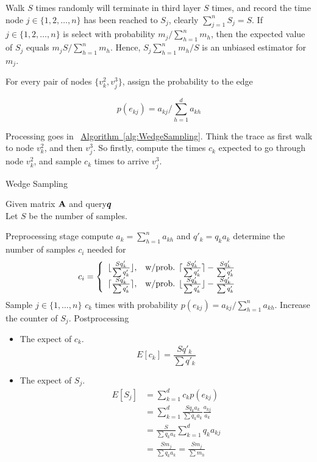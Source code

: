 \documentclass{article}
\newcommand{\V}[1]{{\bm{{\MakeLowercase{#1}}}}}%
\newcommand{\M}[1]{{\bm{\mathbf{\MakeUppercase{#1}}}}}%
\newcommand{\Alg}[1]{\hyperref[alg:#1]{Algorithm~\ref*{alg:#1}}}
\begin{document}
Walk $S$ times randomly will terminate in third layer $S$ times, and record the time node $j\in\{1,2,\ldots,n\}$ has been reached to $S_j$, clearly $\sum_{j=1}^{n}S_j = S$. If $j\in\{1,2,\ldots,n\}$ is select with probability $m_j/\sum_{h=1}^{n}m_h $, then the expected value of $S_j$ equals $m_jS/\sum_{h=1}^{n}m_h$. Hence, $S_j\sum_{h=1}^{n}m_h/S$ is an unbiased estimator for $m_j$.

For every pair of nodes $\{v_k^2,v_j^3\}$, assign the probability to the edge

\[p(e_{kj}) = a_{kj}/\sum_{h=1}^{d}a_{kh}\]

Processing goes in ~\Alg{WedgeSampling}. Think the trace as first walk to node $v_k^2$, and then $v_j^3$. So firstly, compute the times $c_k$ expected to go through node $v_k^2$, and sample $c_k$ times to arrive $v_j^3$.
\begin{algorithm}[t]
    \caption{Wedge Sampling}
    \label{alg:WedgeSampling}
    Given  matrix $\M{A}$ and query$\V{q}$\\
    Let $S$ be the number of samples.
    \begin{algorithmic}[1]
    \State Preprocessing stage
    \State compute $a_k = \sum_{h=1}^{n}a_{kh}$ and $q'_k = q_ka_k$
    \EndFor
     determine the number of samples $c_i$ needed for
    \State
    \begin{equation*}c_i=
    \left\{
      \begin{array}{ll}
        \lfloor \frac{Sq'_k}{\sum q'_k} \rfloor,
        & \hbox{w/prob. $\lceil \frac{Sq'_k}{\sum q'_k} \rceil - \frac{Sq'_k}{\sum q'_k}$} \\
        \lceil \frac{Sq'_k}{\sum q'_k} \rceil,
        & \hbox{w/prob. $\lfloor \frac{Sq'_k}{\sum q'_k} \rfloor - \frac{Sq'_k}{\sum q'_k}$}
      \end{array}
    \right.
    \end{equation*}
    \EndFor
    \State  \label{line:edge}
    Sample $j\in \{1,\ldots,n\}$ $c_k$ times with probability
    $p(e_{kj}) = a_{kj}/\sum_{h=1}^{n}a_{kh}$.
    \State Increase the counter of $S_j$.
    \EndFor
    \State Postprocessing
    \end{algorithmic}
\end{algorithm}

\begin{itemize}
  \item The expect of $c_k$.
        \[ E[c_k] = \frac{Sq'_k}{\sum q'_k}\]
  \item The expect of $S_j$.
        \begin{align*}
        E[S_j] &= \sum_{k=1}^{d} c_kp(e_{kj})\\
               &= \sum_{k=1}^{d} \frac{Sq_ka_k}{\sum q_ka_k}\frac{a_{kj}}{a_k}\\
               &= \frac{S}{{\sum q_ka_k}}\sum_{k=1}^{d}q_ka_{kj}\\
               &= \frac{Sm_j}{{\sum q_ka_k}}= \frac{Sm_j}{{\sum m_h}}
        \end{align*}
\end{itemize}
\end{document}
